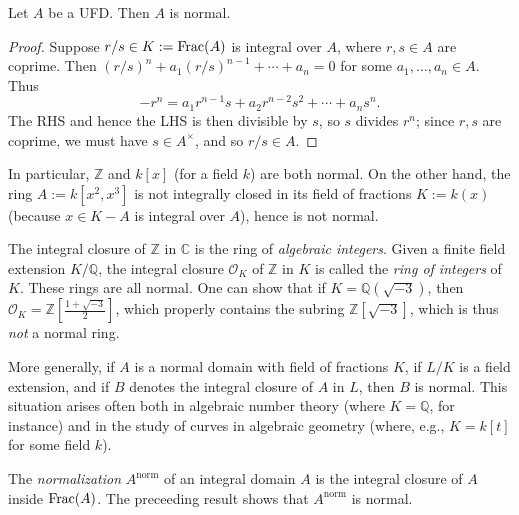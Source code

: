 \documentclass[reqno]{amsart}
\begin{document}
\begin{lemma}
Let $A$ be a UFD.  Then $A$ is normal.
\end{lemma}
\begin{proof}
  Suppose $r/s \in K := \operatorname{Frac}(A)$ is integral over $A$,
  where $r,s \in A$ are coprime.
  Then $(r/s)^n + a_1 (r/s)^{n-1} + \dotsb + a_n = 0$ for some
  $a_1,\dotsc,a_n \in A$.
  Thus
  \[
  -r^n = a_1 r^{n-1} s + a_2 r^{n-2} s^2 + \dotsb + a_n s^n.
  \]
  The RHS and hence the LHS is then divisible by $s$,
  so $s$ divides $r^n$;
  since $r,s$ are coprime, we must have $s \in A^\times$,
  and so $r/s \in A$.
\end{proof}

\begin{example}
  In particular, $\mathbb{Z}$ and $k[x]$ (for a field $k$)
  are both normal.
  On the other hand, the ring $A := k[x^2,x^3]$ is not integrally
  closed in its field of fractions $K := k(x)$ (because $x \in K - A$ is integral over $A$),
  hence is not normal.

  The integral closure of $\mathbb{Z}$ in $\mathbb{C}$ is the
  ring of \emph{algebraic integers}.  Given a finite field
  extension $K/\mathbb{Q}$, the integral closure $\mathcal{O}_K$
  of $\mathbb{Z}$ in $K$ is called the \emph{ring of integers}
  of $K$.  These rings are all normal.
  One can show that if
  $K = \mathbb{Q}(\sqrt{-3})$,
  then $\mathcal{O}_K = \mathbb{Z} [\frac{1 + \sqrt{-3}}{2}]$,
  which properly contains the subring
  $\mathbb{Z}[\sqrt{-3}]$,
  which is thus \emph{not} a normal ring.

  More generally, if $A$ is a normal domain with field of
  fractions $K$, if $L/K$ is a field extension, and if $B$
  denotes the integral closure of $A$ in $L$, then $B$ is
  normal.
  This situation arises often both in algebraic number theory
  (where $K = \mathbb{Q}$, for instance)
  and in the study of curves in algebraic geometry (where,
  e.g., $K = k[t]$ for some field $k$).

\end{example}

The \emph{normalization} \(A^{\mathrm{norm}}\) of an integral domain \(A\)
is the integral closure of \(A\) inside \(\operatorname{Frac}(A)\).
The preceeding result shows that \(A^{\mathrm{norm}}\) is normal.
\end{document}
